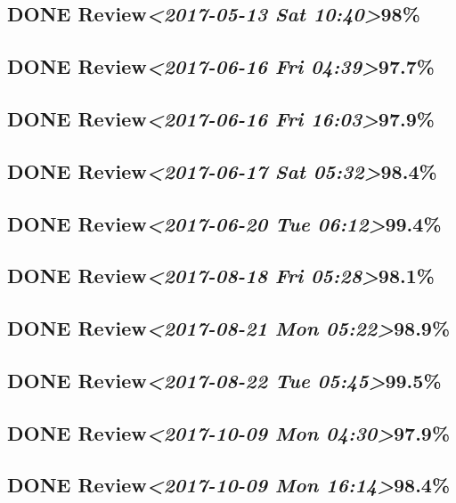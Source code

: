 \documentclass[11pt]{ctexart}
\begin{document}
\subsection{{\bfseries\sffamily DONE} Review\textit{<2017-05-13 Sat 10:40>}98\%}
\label{sec:org71ddb0c}
\subsection{{\bfseries\sffamily DONE} Review\textit{<2017-06-16 Fri 04:39>}97.7\%}
\label{sec:org49ad790}
\subsection{{\bfseries\sffamily DONE} Review\textit{<2017-06-16 Fri 16:03>}97.9\%}
\label{sec:orgd51a4c4}
\subsection{{\bfseries\sffamily DONE} Review\textit{<2017-06-17 Sat 05:32>}98.4\%}
\label{sec:org5430644}
\subsection{{\bfseries\sffamily DONE} Review\textit{<2017-06-20 Tue 06:12>}99.4\%}
\label{sec:orgf62b098}
\subsection{{\bfseries\sffamily DONE} Review\textit{<2017-08-18 Fri 05:28>}98.1\%}
\label{sec:org832a938}
\subsection{{\bfseries\sffamily DONE} Review\textit{<2017-08-21 Mon 05:22>}98.9\%}
\label{sec:org8ce0423}
\subsection{{\bfseries\sffamily DONE} Review\textit{<2017-08-22 Tue 05:45>}99.5\%}
\label{sec:org51187a9}
\subsection{{\bfseries\sffamily DONE} Review\textit{<2017-10-09 Mon 04:30>}97.9\%}
\label{sec:orgeab1eb4}
\subsection{{\bfseries\sffamily DONE} Review\textit{<2017-10-09 Mon 16:14>}98.4\%}
\label{sec:org0d0e4bc}
\end{document}
